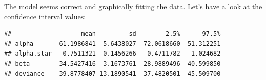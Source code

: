 \documentclass[]{article}
\newenvironment{Shaded}{\begin{snugshade}}{\end{snugshade}}
\newcommand{\DecValTok}[1]{\textcolor[rgb]{0.00,0.00,0.81}{#1}}
\newcommand{\KeywordTok}[1]{\textcolor[rgb]{0.13,0.29,0.53}{\textbf{#1}}}
\newcommand{\NormalTok}[1]{#1}
\newcommand{\OperatorTok}[1]{\textcolor[rgb]{0.81,0.36,0.00}{\textbf{#1}}}
\begin{document}
The model seems correct and graphically fitting the data. Let's have a
look at the confidence interval values:

\begin{Shaded}
\end{Shaded}

\begin{verbatim}
##                   mean         sd        2.5%      97.5%
## alpha      -61.1986841  5.6438027 -72.0618660 -51.312251
## alpha.star   0.7511321  0.1456266   0.4711782   1.024682
## beta        34.5427416  3.1673761  28.9889496  40.599850
## deviance    39.8778407 13.1890541  37.4820501  45.509700
\end{verbatim}
\end{document}
